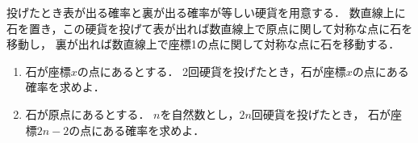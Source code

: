 \documentclass[../../main.tex]{subfiles}
\begin{document}
投げたとき表が出る確率と裏が出る確率が等しい硬貨を用意する．
数直線上に石を置き，この硬貨を投げて表が出れば数直線上で原点に関して対称な点に石を移動し，
裏が出れば数直線上で座標1の点に関して対称な点に石を移動する．
\begin{enumerate}
  \item 石が座標$x$の点にあるとする．
    2回硬貨を投げたとき，石が座標$x$の点にある確率を求めよ．
  \item 石が原点にあるとする．
    $n$を自然数とし，$2n$回硬貨を投げたとき，
    石が座標$2n-2$の点にある確率を求めよ．
\end{enumerate}
\end{document}
